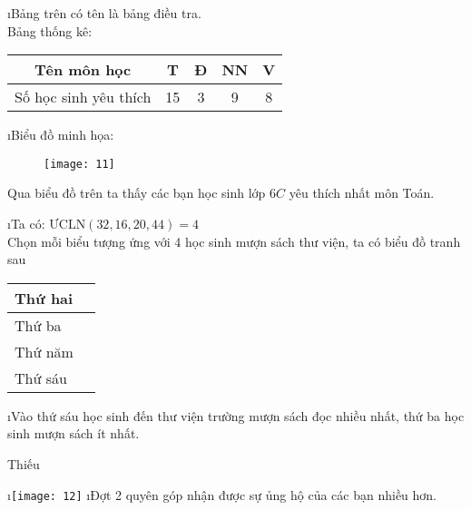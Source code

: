 \begin{Answer}{11}
		\begin{enumerate}[a),leftmargin=*]
			\i	Bảng trên có tên là bảng điều tra.\\
			Bảng thống kê:
			\begin{center}
				\begin{tabular}{|c|c|c|c|c|}
					\hline
					Tên môn học&	T&	Đ&	NN&	V\\
					\hline
					Số học sinh yêu thích&	15&	3&	9&	8\\
					\hline
				\end{tabular}
			\end{center}
			\i	Biểu đồ minh họa:
			\begin{figure}[H]
				\centering
				\vspace*{-5pt}
				\captionsetup{labelformat= empty, justification=centering}
				\texttt{[image: 11]}
				\vspace*{-10pt}
			\end{figure}
			Qua biểu đồ trên ta thấy các bạn học sinh lớp $6C$ yêu thích nhất môn Toán.
		\end{enumerate}
	
\end{Answer}
\begin{Answer}{12}
		\begin{enumerate}[a),leftmargin=*]
			\i Ta có: ${\text{ƯCLN}}(32,16,20,44) = 4$\\
			Chọn mỗi biểu tượng  ứng với 4 học sinh mượn sách thư viện, ta có biểu đồ tranh sau
			\begin{center}
				\begin{tabular}{|l|l|}
					\hline
					Thứ hai&	\\
					\hline
					Thứ ba	&	\\
					\hline
					Thứ năm&	\\
					\hline
					Thứ sáu	&	\\
					\hline
				\end{tabular}
			\end{center}
			\i Vào thứ sáu học sinh đến thư viện trường mượn sách đọc nhiều nhất, thứ ba học sinh mượn sách ít nhất.
			
		\end{enumerate}
	
\end{Answer}
\begin{Answer}{13}
		Thiếu
	
\end{Answer}
\begin{Answer}{14}
		\begin{enumerate}[a),leftmargin=*]
			\i \texttt{[image: 12]}
			\i Đợt 2 quyên góp nhận được sự ủng hộ của các bạn nhiều hơn.
		\end{enumerate}
	
\end{Answer}
